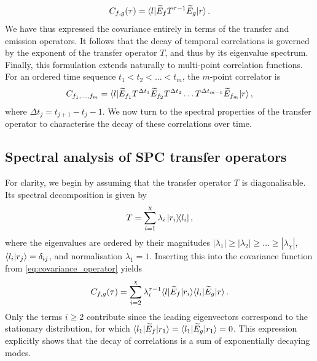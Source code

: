 \begin{equation}\label{eq:covariance_operator}
    C_{f,g}(\tau) = \braket{l|\widetilde{E}_f T^{\tau - 1} \widetilde{E}_g|r}.
\end{equation}
We have thus expressed the covariance entirely in terms of the transfer and emission operators. It follows that the decay of temporal correlations is governed by the exponent of the transfer operator \(T\), and thus by its eigenvalue spectrum. Finally, this formulation extends naturally to multi-point correlation functions. For an ordered time sequence \(t_1 < t_2 < \dots < t_m\), the \(m\)-point correlator is
\begin{equation}
    C_{f_1,\dots,f_m} = \braket{l|\widetilde{E}_{f_1} T^{\Delta t_1} \widetilde{E}_{f_2} T^{\Delta t_2} \dots T^{\Delta t_{m-1}}\widetilde{E}_{f_m}|r},
\end{equation}
where \(\Delta t_j = t_{j+1} - t_j - 1\). We now turn to the spectral properties of the transfer operator to characterise the decay of these correlations over time.

\subsection{Spectral analysis of SPC transfer operators}
For clarity, we begin by assuming that the transfer operator \(T\) is diagonalisable. Its spectral decomposition is given by
\begin{equation*}
    T = \sum_{i=1}^{\chi} \lambda_i \ket{r_i}\!\!\bra{l_i},
\end{equation*}
where the eigenvalues are ordered by their magnitudes \(|\lambda_1| \geq |\lambda_2| \geq \dots \geq |\lambda_{\chi}|\), \(\braket{l_i|r_j} = \delta_{ij}\), and normalisation \(\lambda_1 = 1\). Inserting this into the covariance function from \cref{eq:covariance_operator} yields
\begin{equation*}
    C_{f,g}(\tau) = \sum_{i=2}^{\chi} \lambda_i^{\tau - 1} \! \braket{l|\widetilde{E}_f|r_i} \! \braket{l_i|\widetilde{E}_g|r}.
\end{equation*}
Only the terms \(i \geq 2\) contribute since the leading eigenvectors correspond to the stationary distribution, for which \(\braket{l_1|\widetilde{E}_f|r_1} = \braket{l_1|\widetilde{E}_g|r_1} = 0\). This expression explicitly shows that the decay of correlations is a sum of exponentially decaying modes.

